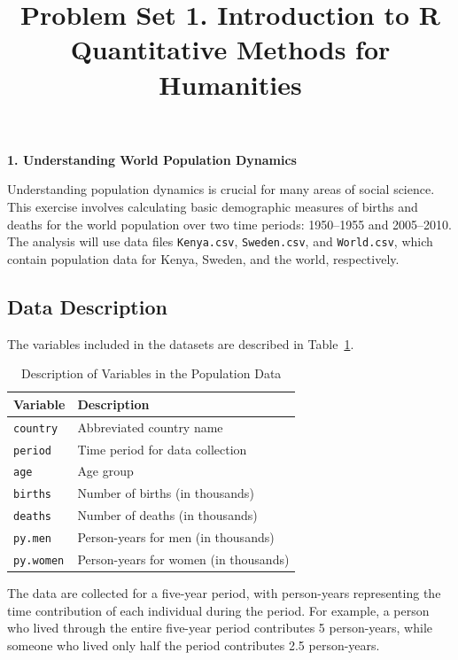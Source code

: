 \documentclass[12pt]{article}
\author{\empty}
\title{Problem Set 1. Introduction to R \\ Quantitative Methods for Humanities}
\date{\empty}
\begin{document}
\maketitle

\begin{center}
    \textbf{\large 1. Understanding World Population Dynamics}    
\end{center}

Understanding population dynamics is crucial for many areas of social science. This exercise involves calculating basic demographic measures of births and deaths for the world population over two time periods: 1950–1955 and 2005–2010. The analysis will use data files \texttt{Kenya.csv}, \texttt{Sweden.csv}, and \texttt{World.csv}, which contain population data for Kenya, Sweden, and the world, respectively.

\subsection*{Data Description}

The variables included in the datasets are described in Table~\ref{tab:world-pop-data}.

\begin{table}[h]
\centering
\caption{Description of Variables in the Population Data}\label{tab:world-pop-data}
\begin{tabular}{ll}
\toprule
\textbf{Variable} & \textbf{Description} \\
\midrule
\texttt{country} & Abbreviated country name \\
\texttt{period} & Time period for data collection \\
\texttt{age} & Age group \\
\texttt{births} & Number of births (in thousands) \\
\texttt{deaths} & Number of deaths (in thousands) \\
\texttt{py.men} & Person-years for men (in thousands) \\
\texttt{py.women} & Person-years for women (in thousands) \\
\bottomrule
\end{tabular}
\end{table}

The data are collected for a five-year period, with person-years representing the time contribution of each individual during the period. For example, a person who lived through the entire five-year period contributes 5 person-years, while someone who lived only half the period contributes 2.5 person-years.
\end{document}
